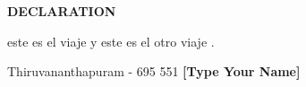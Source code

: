  \setcounter{page}{2}
\begin{center}
{\Large{\bf{DECLARATION}}}
\end{center}

\noindent

este es el viaje \cite{pang2008opinion} y este es el otro viaje \cite{pak2010twitter}.

\vspace{4cm} %

\noindent Thiruvananthapuram - 695 551 \hfill \textbf{[Type Your Name]}

 \hfill

\clearpage
